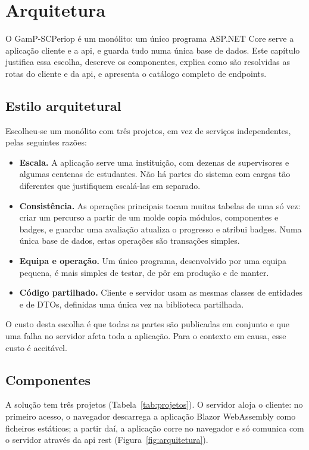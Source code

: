 \chapter{Arquitetura}
\label{cap:arquitetura}

O GamP-SCPeriop é um monólito: um único programa ASP.NET Core serve a aplicação cliente e a \gls{api}, e guarda tudo numa única base de dados. Este capítulo justifica essa escolha, descreve os componentes, explica como são resolvidas as rotas do cliente e da \gls{api}, e apresenta o catálogo completo de endpoints.

\section{Estilo arquitetural}
\label{sec:estilo}

Escolheu-se um monólito com três projetos, em vez de serviços independentes, pelas seguintes razões:

\begin{itemize}
    \item \textbf{Escala.} A aplicação serve uma instituição, com dezenas de supervisores e algumas centenas de estudantes. Não há partes do sistema com cargas tão diferentes que justifiquem escalá-las em separado.
    \item \textbf{Consistência.} As operações principais tocam muitas tabelas de uma só vez: criar um percurso a partir de um molde copia módulos, componentes e badges, e guardar uma avaliação atualiza o progresso e atribui badges. Numa única base de dados, estas operações são transações simples.
    \item \textbf{Equipa e operação.} Um único programa, desenvolvido por uma equipa pequena, é mais simples de testar, de pôr em produção e de manter.
    \item \textbf{Código partilhado.} Cliente e servidor usam as mesmas classes de entidades e de DTOs, definidas uma única vez na biblioteca partilhada.
\end{itemize}

O custo desta escolha é que todas as partes são publicadas em conjunto e que uma falha no servidor afeta toda a aplicação. Para o contexto em causa, esse custo é aceitável.

\section{Componentes}

A solução tem três projetos (Tabela~\ref{tab:projetos}). O servidor aloja o cliente: no primeiro acesso, o navegador descarrega a aplicação Blazor WebAssembly como ficheiros estáticos; a partir daí, a aplicação corre no navegador e só comunica com o servidor através da \gls{api} \gls{rest} (Figura~\ref{fig:arquitetura}).

